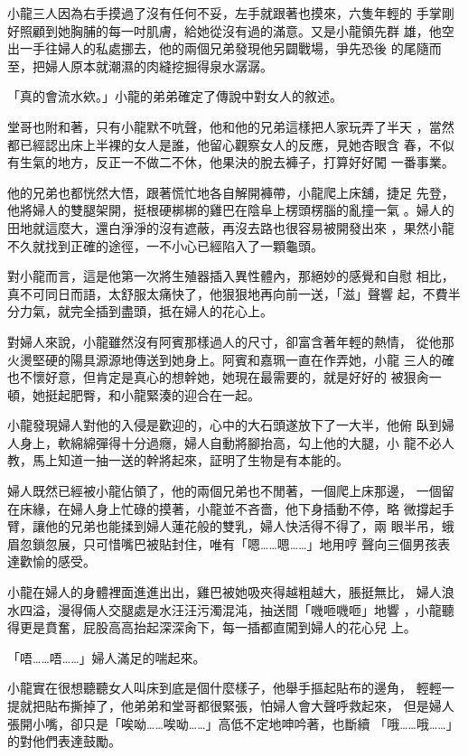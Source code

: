 小龍三人因為右手摸過了沒有任何不妥，左手就跟著也摸來，六隻年輕的
手掌剛好照顧到她胸脯的每一吋肌膚，給她從沒有過的滿意。又是小龍領先群
雄，他空出一手往婦人的私處挪去，他的兩個兄弟發現他另闢戰場，爭先恐後
的尾隨而至，把婦人原本就潮濕的肉縫挖掘得泉水潺潺。

「真的會流水欸。」小龍的弟弟確定了傳說中對女人的敘述。

堂哥也附和著，只有小龍默不吭聲，他和他的兄弟這樣把人家玩弄了半天
，當然都已經認出床上半裸的女人是誰，他留心觀察女人的反應，見她杏眼含
春，不似有生氣的地方，反正一不做二不休，他果決的脫去褲子，打算好好闖
一番事業。

他的兄弟也都恍然大悟，跟著慌忙地各自解開褲帶，小龍爬上床舖，捷足
先登，他將婦人的雙腿架開，挺根硬梆梆的雞巴在陰阜上楞頭楞腦的亂撞一氣
。婦人的田地就這麼大，還白淨淨的沒有遮蔽，再沒去路也很容易被開發出來
，果然小龍不久就找到正確的途徑，一不小心已經陷入了一顆龜頭。

對小龍而言，這是他第一次將生殖器插入異性體內，那絕妙的感覺和自慰
相比，真不可同日而語，太舒服太痛快了，他狠狠地再向前一送，「滋」聲響
起，不費半分力氣，就完全插到盡頭，抵在婦人的花心上。

對婦人來說，小龍雖然沒有阿賓那樣過人的尺寸，卻富含著年輕的熱情，
從他那火燙堅硬的陽具源源地傳送到她身上。阿賓和嘉珮一直在作弄她，小龍
三人的確也不懷好意，但肯定是真心的想幹她，她現在最需要的，就是好好的
被狠肏一頓，她挺起肥臀，和小龍緊湊的迎合在一起。

小龍發現婦人對他的入侵是歡迎的，心中的大石頭遂放下了一大半，他俯
臥到婦人身上，軟綿綿彈得十分過癮，婦人自動將腳抬高，勾上他的大腿，小
龍不必人教，馬上知道一抽一送的幹將起來，証明了生物是有本能的。

婦人既然已經被小龍佔領了，他的兩個兄弟也不閒著，一個爬上床那邊，
一個留在床緣，在婦人身上忙碌的摸著，小龍並不吝嗇，他下身插動不停，略
微撐起手臂，讓他的兄弟也能揉到婦人蓮花般的雙乳，婦人快活得不得了，兩
眼半吊，蛾眉忽鎖忽展，只可惜嘴巴被貼封住，唯有「嗯……嗯……」地用哼
聲向三個男孩表達歡愉的感受。

小龍在婦人的身體裡面進進出出，雞巴被她吸夾得越粗越大，脹挺無比，
婦人浪水四溢，漫得倆人交腿處是水汪汪污濁混沌，抽送間「嘰咂嘰咂」地響
，小龍聽得更是賁奮，屁股高高抬起深深肏下，每一插都直闖到婦人的花心兒
上。

「唔……唔……」婦人滿足的喘起來。

小龍實在很想聽聽女人叫床到底是個什麼樣子，他舉手摳起貼布的邊角，
輕輕一提就把貼布撕掉了，他弟弟和堂哥都很緊張，怕婦人會大聲呼救起來，
但是婦人張開小嘴，卻只是「唉呦……唉呦……」高低不定地呻吟著，也斷續
「哦……哦……」的對他們表達鼓勵。

